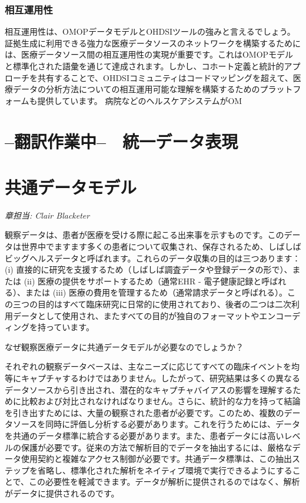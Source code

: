\documentclass[
  11pt]{book}
\theoremstyle{definition}
\theoremstyle{definition}
\theoremstyle{definition}
\theoremstyle{definition}
\theoremstyle{remark}
\begin{document}
\subsection{相互運用性}\label{ux76f8ux4e92ux904bux7528ux6027}

相互運用性は、OMOPデータモデルとOHDSIツールの強みと言えるでしょう。証拠生成に利用できる強力な医療データソースのネットワークを構築するためには、医療データソース間の相互運用性の実現が重要です。これはOMOPモデルと標準化された語彙を通じて達成されます。しかし、コホート定義と統計的アプローチを共有することで、OHDSIコミュニティはコードマッピングを超えて、医療データの分析方法についての相互運用可能な理解を構築するためのプラットフォームも提供しています。
病院などのヘルスケアシステムがOM

\chapter*{--翻訳作業中--　統一データ表現}\label{ux7ffbux8a33ux4f5cux696dux4e2d-ux7d71ux4e00ux30c7ux30fcux30bfux8868ux73fe}

\chapter{共通データモデル}\label{CommonDataModel}

\emph{章担当: Clair Blacketer}

観察データは、患者が医療を受ける際に起こる出来事を示すものです。このデータは世界中でますます多くの患者について収集され、保存されるため、しばしばビッグヘルスデータと呼ばれます。これらのデータ収集の目的は三つあります：(i) 直接的に研究を支援するため（しばしば調査データや登録データの形で）、または (ii) 医療の提供をサポートするため（通常EHR - 電子健康記録と呼ばれる）、または (iii) 医療の費用を管理するため（通常請求データと呼ばれる）。この三つの目的はすべて臨床研究に日常的に使用されており、後者の二つは二次利用データとして使用され、またすべての目的が独自のフォーマットやエンコーディングを持っています。   

なぜ観察医療データに共通データモデルが必要なのでしょうか？

それぞれの観察データベースは、主なニーズに応じてすべての臨床イベントを均等にキャプチャするわけではありません。したがって、研究結果は多くの異なるデータソースから引き出され、潜在的なキャプチャバイアスの影響を理解するために比較および対比されなければなりません。さらに、統計的な力を持って結論を引き出すためには、大量の観察された患者が必要です。このため、複数のデータソースを同時に評価し分析する必要があります。これを行うためには、データを共通のデータ標準に統合する必要があります。また、患者データには高いレベルの保護が必要です。従来の方法で解析目的でデータを抽出するには、厳格なデータ使用契約と複雑なアクセス制御が必要です。共通データ標準は、この抽出ステップを省略し、標準化された解析をネイティブ環境で実行できるようにすることで、この必要性を軽減できます。データが解析に提供されるのではなく、解析がデータに提供されるのです。
\end{document}
